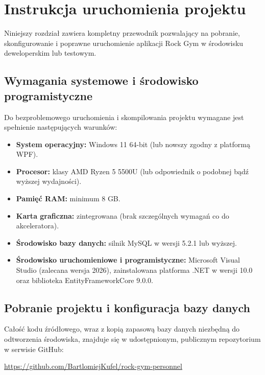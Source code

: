 \chapter{Instrukcja uruchomienia projektu}
\label{ch:instrukcja}

Niniejszy rozdział zawiera kompletny przewodnik pozwalający na pobranie, skonfigurowanie i poprawne uruchomienie aplikacji Rock Gym w środowisku deweloperskim lub testowym.

\section{Wymagania systemowe i środowisko programistyczne}
Do bezproblemowego uruchomienia i skompilowania projektu wymagane jest spełnienie następujących warunków:
\begin{itemize}
    \item \textbf{System operacyjny:} Windows 11 64-bit (lub nowszy zgodny z platformą WPF).
    \item \textbf{Procesor:} klasy AMD Ryzen 5 5500U (lub odpowiednik o podobnej bądź wyższej wydajności).
    \item \textbf{Pamięć RAM:} minimum 8 GB.
    \item \textbf{Karta graficzna:} zintegrowana (brak szczególnych wymagań co do akceleratora).
    \item \textbf{Środowisko bazy danych:} silnik MySQL w wersji 5.2.1 lub wyższej.
    \item \textbf{Środowisko uruchomieniowe i programistyczne:} Microsoft Visual Studio (zalecana wersja 2026), zainstalowana platforma .NET w wersji 10.0 oraz biblioteka EntityFrameworkCore 9.0.0.
\end{itemize}

\section{Pobranie projektu i konfiguracja bazy danych}
Całość kodu źródłowego, wraz z kopią zapasową bazy danych niezbędną do odtworzenia środowiska, znajduje się w udostępnionym, publicznym repozytorium w serwisie GitHub:
\begin{center}
    \url{https://github.com/BartlomiejKufel/rock-gym-personnel}
\end{center}

